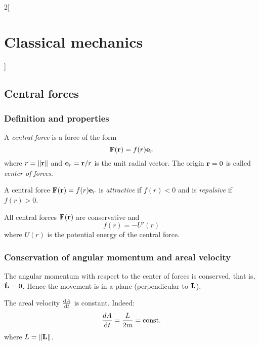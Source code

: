 \documentclass[../../../main.tex]{subfiles}
\begin{document}
\begin{multicols}{2}[\section{Classical mechanics}]
  \subsection{Central forces}
  \subsubsection{Definition and properties}
  \begin{definition}
    A \emph{central force} is a force of the form
    \begin{equation}\label{CM_central-force}
      \boldsymbol{\mathrm{F}}(\boldsymbol{\mathrm{r}})=f(r)\boldsymbol{\mathrm{e}}_r
    \end{equation} where $r=\|\boldsymbol{\mathrm{r}}\|$ and $\boldsymbol{\mathrm{e}}_r=\boldsymbol{\mathrm{r}}/r$ is the unit radial vector. The origin $\boldsymbol{\mathrm{r}}=0$ is called \emph{center of forces}.
  \end{definition}
  \begin{definition}
    A central force $\boldsymbol{\mathrm{F}}(\boldsymbol{\mathrm{r}})=f(r)\boldsymbol{\mathrm{e}}_r$ is \emph{attractive} if $f(r)<0$ and is \emph{repulsive} if $f(r)>0$.
  \end{definition}
  \begin{proposition}
    All central forces $\boldsymbol{\mathrm{F}}(\boldsymbol{\mathrm{r}})$ are conservative and $$f(r)=-U'(r)$$ where $U(r)$ is the potential energy of the central force.
  \end{proposition}
  \subsubsection{Conservation of angular momentum and areal velocity}
  \begin{proposition}
    The angular momentum with respect to the center of forces is conserved, that is, $\dot{\boldsymbol{\mathrm{L}}}=0$. Hence the movement is in a plane (perpendicular to $\boldsymbol{\mathrm{L}}$).
  \end{proposition}
  \begin{proposition}
    The areal velocity $\dv{A}{t}$ is constant. Indeed: $$\frac{dA}{\dd{t}}=\frac{L}{2m}=\text{const.}$$ where $L=\|\boldsymbol{\mathrm{L}}\|$.
  \end{proposition}

\end{multicols}
\end{document}
